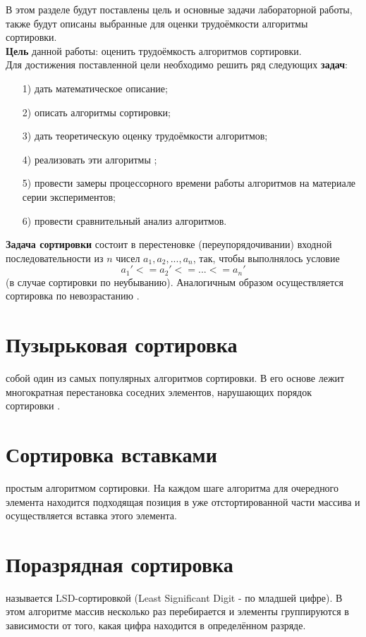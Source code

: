 В этом разделе будут поставлены цель и основные задачи лабораторной работы, также будут описаны выбранные для оценки трудоёмкости алгоритмы сортировки.\\

\textbf{Цель} данной работы: оценить трудоёмкость алгоритмов сортировки.\\

Для достижения поставленной цели необходимо решить ряд следующих \textbf{задач}:
\begin{enumerate}
\item[1)] дать математическое описание;
\item[2)] описать алгоритмы сортировки;
\item[3)] дать теоретическую оценку трудоёмкости алгоритмов;
\item[4)] реализовать эти алгоритмы ;
\item[5)] провести замеры процессорного времени работы алгоритмов на материале серии экспериментов;
\item[6)] провести сравнительный анализ алгоритмов.
\end{enumerate}

\textbf{Задача сортировки} состоит в перестеновке (переупорядочивании) входной последовательности из $n$ чисел ${a_1, a_2, ..., a_n}$, так, чтобы выполнялось условие
\begin{equation}
	a_1' <= a_2' <= ... <= a_n'
\end{equation} (в случае сортировки по неубыванию). Аналогичным образом осуществляется сортировка по невозрастанию \cite{Kormen}.

\section{Пузырьковая сортировка}
 собой один из самых популярных алгоритмов сортировки. В его основе лежит многократная перестановка соседних элементов, нарушающих порядок сортировки \cite{Kormen}.

\section{Сортировка вставками}
 простым алгоритмом сортировки. На каждом шаге алгоритма для очередного элемента находится подходящая позиция в уже отстортированной части массива и осуществляется вставка этого элемента. 

\section{Поразрядная сортировка}
 называется LSD-сортировкой (Least Significant Digit - по младшей цифре). В этом алгоритме массив несколько раз перебирается и элементы группируются в зависимости от того, какая цифра находится в определённом разряде. 

